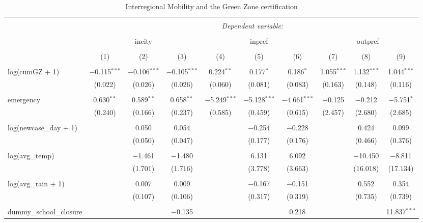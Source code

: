 
\begin{sidewaystable}[!htbp] \centering 
  \caption{Interregional Mobility and the Green Zone certification} 
  \label{} 
\begin{tabular}{@{\extracolsep{5pt}}lccccccccc} 
\\[-1.8ex]\hline 
\hline \\[-1.8ex] 
 & \multicolumn{9}{c}{\textit{Dependent variable:}} \\ 
\cline{2-10} 
\\[-1.8ex] & \multicolumn{3}{c}{incity} & \multicolumn{3}{c}{inpref} & \multicolumn{3}{c}{outpref} \\ 
\\[-1.8ex] & (1) & (2) & (3) & (4) & (5) & (6) & (7) & (8) & (9)\\ 
\hline \\[-1.8ex] 
 log(cumGZ + 1) & $-$0.115$^{***}$ & $-$0.106$^{***}$ & $-$0.105$^{***}$ & 0.224$^{**}$ & 0.177$^{*}$ & 0.186$^{*}$ & 1.055$^{***}$ & 1.132$^{***}$ & 1.044$^{***}$ \\ 
  & (0.022) & (0.026) & (0.026) & (0.060) & (0.081) & (0.083) & (0.163) & (0.148) & (0.116) \\ 
  & & & & & & & & & \\ 
 emergency & 0.630$^{**}$ & 0.589$^{**}$ & 0.658$^{**}$ & $-$5.249$^{***}$ & $-$5.128$^{***}$ & $-$4.661$^{***}$ & $-$0.125 & $-$0.212 & $-$5.751$^{*}$ \\ 
  & (0.240) & (0.166) & (0.237) & (0.585) & (0.459) & (0.615) & (2.457) & (2.680) & (2.685) \\ 
  & & & & & & & & & \\ 
 log(newcase\_day + 1) &  & 0.050 & 0.054 &  & $-$0.254 & $-$0.228 &  & 0.424 & 0.099 \\ 
  &  & (0.050) & (0.047) &  & (0.177) & (0.176) &  & (0.466) & (0.376) \\ 
  & & & & & & & & & \\ 
 log(avg\_temp) &  & $-$1.461 & $-$1.480 &  & 6.131 & 6.092 &  & $-$10.450 & $-$8.811 \\ 
  &  & (1.701) & (1.716) &  & (3.778) & (3.663) &  & (16.018) & (17.134) \\ 
  & & & & & & & & & \\ 
 log(avg\_rain + 1) &  & 0.007 & 0.009 &  & $-$0.167 & $-$0.151 &  & 0.552 & 0.354 \\ 
  &  & (0.107) & (0.106) &  & (0.317) & (0.319) &  & (0.735) & (0.739) \\ 
  & & & & & & & & & \\ 
 dummy\_school\_closure &  &  & $-$0.135 &  &  & 0.218 &  &  & 11.837$^{***}$ \\ 

\end{tabular}
\end{sidewaystable}
